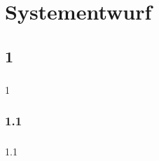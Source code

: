 \chapter{Systementwurf}\label{chp:systementwurf}


\section{1}
\paragraph{}
1

\subsection{1.1}
\paragraph{}
1.1